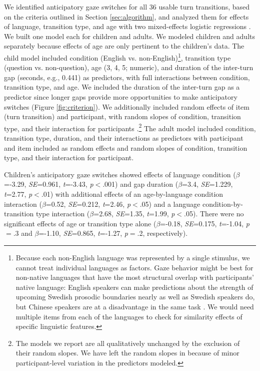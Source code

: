 \documentclass[authoryear, 12pt]{elsarticle}
\begin{document}
We identified anticipatory gaze switches for all 36 usable turn transitions, based on the criteria outlined in Section \ref{sec:algorithm}, and analyzed them for effects of language, transition type, and age with two mixed-effects logistic regressions \citep{lme4, R}. We built one model each for children and adults. We modeled children and adults separately because effects of age are only pertinent to the children's data. The child model included condition (English vs. non-English)\footnote{Because each non-English language was represented by a single stimulus, we cannot treat individual languages as factors. Gaze behavior might be best for non-native languages that have the most structural overlap with participants' native language: English speakers can make predictions about the strength of upcoming Swedish prosodic boundaries nearly as well as Swedish speakers do, but Chinese speakers are at a disadvantage in the same task \citep{carlson2005}. We would need multiple items from each of the languages to check for similarity effects of specific linguistic features.}, transition type (question vs. non-question), age (3, 4, 5; numeric), and duration of the inter-turn gap (seconds, e.g., 0.441) as predictors, with full interactions between condition, transition type, and age.  We included the duration of the inter-turn gap as a predictor since longer gaps provide more opportunities to make anticipatory switches (Figure \ref{fig:criterion}). We additionally included random effects of item (turn transition) and participant, with random slopes of condition, transition type, and their interaction for participants \citep{barr2013}.\footnote{The models we report are all qualitatively unchanged by the exclusion of their random slopes. We have left the random slopes in because of minor participant-level variation in the predictors modeled.} The adult model included condition, transition type, duration, and their interactions as predictors with participant and item included as random effects and random slopes of condition, transition type, and their interaction for participant.

Children's anticipatory gaze switches showed effects of language condition (\textit{$\beta$}=-3.29, \textit{SE}=0.961, \textit{t}=-3.43, \textit{p}$<$.001) and gap duration (\textit{$\beta$}=3.4, \textit{SE}=1.229, \textit{t}=2.77, \textit{p}$<$.01) with additional effects of an age-by-language condition interaction (\textit{$\beta$}=0.52, \textit{SE}=0.212, \textit{t}=2.46, \textit{p}$<$.05) and a language condition-by-transition type interaction (\textit{$\beta$}=2.68, \textit{SE}=1.35, \textit{t}=1.99, \textit{p}$<$.05). There were no significant effects of age or transition type alone (\textit{$\beta$}=-0.18, \textit{SE}=0.175, \textit{t}=-1.04, \textit{p}$=$.3 and \textit{$\beta$}=-1.10, \textit{SE}=0.865, \textit{t}=-1.27, \textit{p}$=$.2, respectively). 
\end{document}
